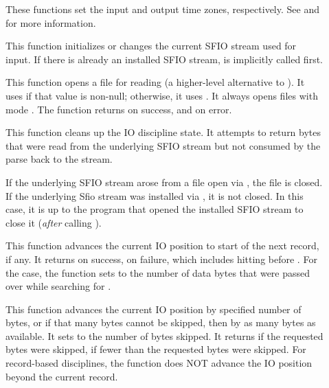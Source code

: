 \begin{description}
\item[\small{}]
\item[\small{}]
These functions set the  input and output time zones, respectively.  
See  and
 for more information.

\item[\small{}]
This function initializes or changes the current SFIO stream used for input.
If there is already an installed SFIO stream,  is
implicitly called first.

\item[\small{}]
This function opens a file for reading (a higher-level alternative to ).
It uses  if that value is non-null;
otherwise, it  uses .  It always opens files with mode
.  The function returns  on success, and
 on error.

\item[\small{}]
This function cleans up the IO discipline state.  It attempts to return bytes that were
read from the underlying SFIO stream but not consumed by the parse
back to the stream.

If the underlying SFIO stream arose from a file open via ,
the file is closed.  If the underlying Sfio stream was installed via
, it is not closed. In this case, it is up to the
program that opened the installed SFIO stream to close it
(\textit{after} calling ). 

\item[\small{}]
This function advances the current IO position to start of the next record, if any.
It returns  on success,  on failure, which
includes hitting  before .
For the  case, the function sets  to the number of
data bytes that were passed over while searching for .

\item[\small{}]
This function advances the current IO position by specified number of bytes, or if that many
bytes cannot be skipped, then by as many bytes as available.
It sets  to the number of bytes skipped.
It returns  if the requested bytes were skipped,  if fewer
than the requested bytes were skipped.  For record-based 
disciplines, the function does NOT advance the IO position beyond the
current record.


\end{description}
